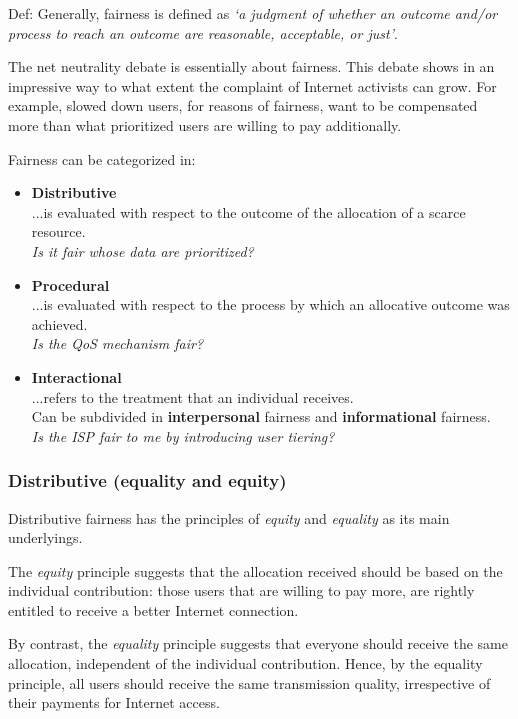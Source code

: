 
Def: Generally, fairness is defined as \emph{`a judgment of whether an outcome and/or process to reach an outcome are reasonable, acceptable, or just'}.

The net neutrality debate is essentially about fairness. This debate shows in an impressive way to what extent the complaint of Internet activists can grow. For example, slowed down users, for reasons of fairness, want to be compensated more than what prioritized users are willing to pay additionally.

Fairness can be categorized in:
\begin{itemize}
	\item \textbf{Distributive}\\
		...is evaluated with respect to the outcome of the allocation of a scarce resource.\\
		\emph{Is it fair whose data are prioritized?}

	\item \textbf{Procedural}\\
		...is evaluated with respect to the process by which an allocative outcome was achieved.\\
		\emph{Is the QoS mechanism fair?}

	\item \textbf{Interactional}\\
		...refers to the treatment that an individual receives.\\
		Can be subdivided in \textbf{interpersonal} fairness and \textbf{informational} fairness.\\
		\emph{Is the ISP fair to me by introducing user tiering?}
\end{itemize}

\subsubsection{Distributive (equality and equity)}
Distributive fairness has the principles of \emph{equity} and \emph{equality} as its main underlyings.

The \emph{equity} principle suggests that the allocation received should be based on the individual contribution: those users that are willing to pay more, are rightly entitled to receive a better Internet connection.

By contrast, the \emph{equality} principle suggests that everyone should receive the same allocation, independent of the individual contribution. Hence, by the equality principle, all users should receive the same transmission quality, irrespective of their payments for Internet access.

